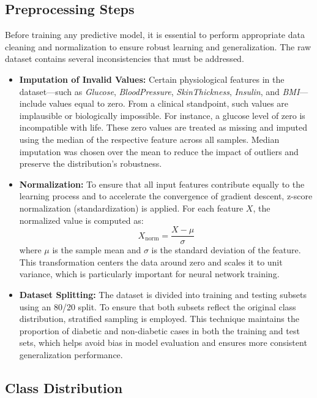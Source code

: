 \documentclass[12pt]{article}
\begin{document}
\subsection{Preprocessing Steps}

Before training any predictive model, it is essential to perform appropriate data cleaning and normalization to ensure robust learning and generalization. The raw dataset contains several inconsistencies that must be addressed.

\begin{itemize}
    \item \textbf{Imputation of Invalid Values:} Certain physiological features in the dataset—such as \textit{Glucose}, \textit{BloodPressure}, \textit{SkinThickness}, \textit{Insulin}, and \textit{BMI}—include values equal to zero. From a clinical standpoint, such values are implausible or biologically impossible. For instance, a glucose level of zero is incompatible with life. These zero values are treated as missing and imputed using the median of the respective feature across all samples. Median imputation was chosen over the mean to reduce the impact of outliers and preserve the distribution's robustness.
    
    \item \textbf{Normalization:} To ensure that all input features contribute equally to the learning process and to accelerate the convergence of gradient descent, z-score normalization (standardization) is applied. For each feature \( X \), the normalized value is computed as:
    \[
    X_{\text{norm}} = \frac{X - \mu}{\sigma}
    \]
    where \( \mu \) is the sample mean and \( \sigma \) is the standard deviation of the feature. This transformation centers the data around zero and scales it to unit variance, which is particularly important for neural network training.

    \item \textbf{Dataset Splitting:} The dataset is divided into training and testing subsets using an 80/20 split. To ensure that both subsets reflect the original class distribution, stratified sampling is employed. This technique maintains the proportion of diabetic and non-diabetic cases in both the training and test sets, which helps avoid bias in model evaluation and ensures more consistent generalization performance.
\end{itemize}

\subsection{Class Distribution}
\end{document}
